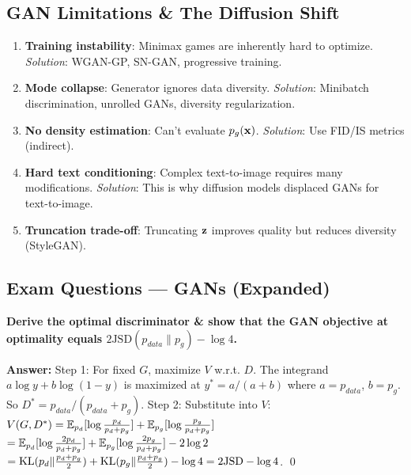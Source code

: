 \subsection{GAN Limitations \& The Diffusion Shift}
\begin{enumerate}
\item \textbf{Training instability}: Minimax games are inherently hard to optimize. \textit{Solution}: WGAN-GP, SN-GAN, progressive training.
\item \textbf{Mode collapse}: Generator ignores data diversity. \textit{Solution}: Minibatch discrimination, unrolled GANs, diversity regularization.
\item \textbf{No density estimation}: Can't evaluate $p_g(\mathbf{x})$. \textit{Solution}: Use FID/IS metrics (indirect).
\item \textbf{Hard text conditioning}: Complex text-to-image requires many modifications. \textit{Solution}: This is why diffusion models displaced GANs for text-to-image.
\item \textbf{Truncation trade-off}: Truncating $\mathbf{z}$ improves quality but reduces diversity (StyleGAN).
\end{enumerate}

\subsection{Exam Questions — GANs (Expanded)}

\begin{examq}
\textbf{Derive the optimal discriminator \& show that the GAN objective at optimality equals $2\text{JSD}(p_{data}\|p_g) - \log 4$.}

\textbf{Answer:} Step 1: For fixed $G$, maximize $V$ w.r.t. $D$. The integrand $a\log y + b\log(1-y)$ is maximized at $y^* = a/(a+b)$ where $a{=}p_{data}$, $b{=}p_g$. So $D^*{=}p_{data}/(p_{data}{+}p_g)$. Step 2: Substitute into $V$:\\
$V(G,D^*) = \mathbb{E}_{p_d}[\log\frac{p_d}{p_d+p_g}] + \mathbb{E}_{p_g}[\log\frac{p_g}{p_d+p_g}]$\\
$= \mathbb{E}_{p_d}[\log\frac{2p_d}{p_d+p_g}] + \mathbb{E}_{p_g}[\log\frac{2p_g}{p_d+p_g}] - 2\log 2$\\
$= \text{KL}(p_d\|\frac{p_d+p_g}{2}) + \text{KL}(p_g\|\frac{p_d+p_g}{2}) - \log 4 = 2\text{JSD} - \log 4$. \qed
\end{examq}

